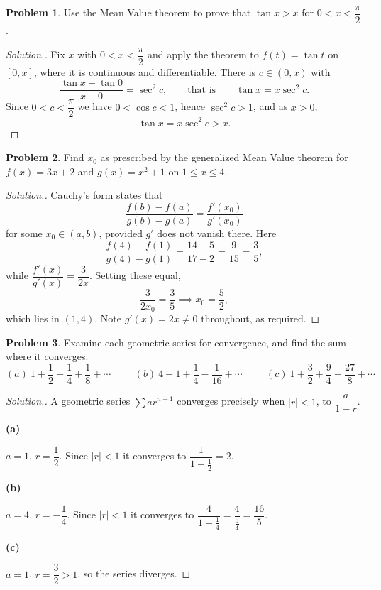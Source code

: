 \documentclass[11pt,a4paper]{article}
\theoremstyle{definition}
\newtheorem{problemx}{Problem}[subsection]
\newenvironment{problem}{\begin{problemx}}{\end{problemx}}
\newenvironment{solution}
  {\renewcommand{\qedsymbol}{}\begin{proof}[\textit{Solution}.]}
  {\end{proof}}
\newcommand{\subhead}[1]{%
  \par\medskip\noindent\textbf{#1}\par\nobreak\smallskip}
\begin{document}
\begin{problem}
Use the Mean Value theorem to prove that
$\tan x > x$ for $0 < x < \dfrac{\pi}{2}$.
\end{problem}
\begin{solution}
Fix $x$ with $0<x<\dfrac{\pi}{2}$ and apply the theorem to $f(t) = \tan t$ on
$[0,x]$, where it is continuous and differentiable. There is $c\in(0,x)$ with
$$\frac{\tan x - \tan 0}{x - 0} = \sec^2 c ,
\qquad\text{that is}\qquad \tan x = x\sec^2 c .$$
Since $0<c<\dfrac{\pi}{2}$ we have $0<\cos c<1$, hence $\sec^2 c>1$, and as
$x>0$,
$$\tan x = x\sec^2c > x .$$
\end{solution}

\begin{problem}
Find $x_0$ as prescribed by the generalized Mean Value theorem for
$f(x) = 3x+2$ and $g(x) = x^2+1$ on $1\leq x\leq 4$.
\end{problem}
\begin{solution}
Cauchy's form states that
$$\frac{f(b)-f(a)}{g(b)-g(a)} = \frac{f'(x_0)}{g'(x_0)}$$
for some $x_0\in(a,b)$, provided $g'$ does not vanish there. Here
$$\frac{f(4)-f(1)}{g(4)-g(1)} = \frac{14-5}{17-2} = \frac{9}{15} = \frac{3}{5},$$
while $\dfrac{f'(x)}{g'(x)} = \dfrac{3}{2x}$. Setting these equal,
$$\frac{3}{2x_0} = \frac{3}{5} \implies x_0 = \frac{5}{2},$$
which lies in $(1,4)$. Note $g'(x) = 2x\neq 0$ throughout, as required.
\end{solution}


\begin{problem}
Examine each geometric series for convergence, and find the sum where it
converges.
$$(a)\ 1+\frac12+\frac14+\frac18+\cdots\hspace{1cm}
(b)\ 4-1+\frac14-\frac{1}{16}+\cdots\hspace{1cm}
(c)\ 1+\frac32+\frac94+\frac{27}{8}+\cdots$$
\end{problem}
\begin{solution}
A geometric series $\sum ar^{n-1}$ converges precisely when
$\left|r\right|<1$, to $\dfrac{a}{1-r}$.

\subhead{(a)}
$a = 1$, $r = \dfrac12$. Since $\left|r\right|<1$ it converges to
$\dfrac{1}{1-\frac12} = 2$.

\subhead{(b)}
$a = 4$, $r = -\dfrac14$. Since $\left|r\right|<1$ it converges to
$\dfrac{4}{1+\frac14} = \dfrac{4}{\frac54} = \dfrac{16}{5}$.

\subhead{(c)}
$a = 1$, $r = \dfrac32 > 1$, so the series diverges.
\end{solution}
\end{document}
